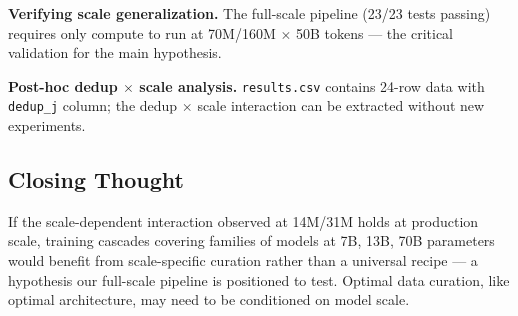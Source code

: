 \textbf{Verifying scale generalization.} The full-scale pipeline (23/23 tests passing) requires only compute to run at 70M/160M $\times$ 50B tokens --- the critical validation for the main hypothesis.

\textbf{Post-hoc dedup $\times$ scale analysis.} \texttt{results.csv} contains 24-row data with \texttt{dedup\_j} column; the dedup $\times$ scale interaction can be extracted without new experiments.

\subsection{Closing Thought}

If the scale-dependent interaction observed at 14M/31M holds at production scale, training cascades covering families of models at 7B, 13B, 70B parameters would benefit from scale-specific curation rather than a universal recipe --- a hypothesis our full-scale pipeline is positioned to test. Optimal data curation, like optimal architecture, may need to be conditioned on model scale.
